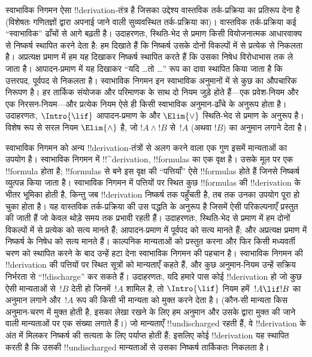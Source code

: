 \documentclass[../../../include/open-logic-section]{subfiles}
\begin{document}
      {}
      {}


स्वाभाविक निगमन ऐसा !!{derivation}-तंत्र है जिसका उद्देश्य वास्तविक
तर्क-प्रक्रिया का प्रतिरूप देना है (विशेषतः गणितज्ञों द्वारा अपनाई जाने वाली
सुव्यवस्थित तर्क-प्रक्रिया का)। वास्तविक तर्क-प्रक्रिया कई ``स्वाभाविक''
ढाँचों से आगे बढ़ती है। उदाहरणतः, स्थिति-भेद से प्रमाण किसी वियोजनात्मक
आधारवाक्य से निष्कर्ष स्थापित करने देता है: हम दिखाते हैं कि निष्कर्ष उसके
दोनों विकल्पों में से प्रत्येक से निकलता है। अप्रत्यक्ष प्रमाण में हम यह
दिखाकर निष्कर्ष स्थापित करते हैं कि उसका निषेध विरोधाभास तक ले जाता है।
आपादन-प्रमाण में यह दिखाकर ``यदि \dots तो \dots'' रूप का दावा स्थापित किया
जाता है कि उत्तरपद, पूर्वपद से निकलता है। स्वाभाविक निगमन इन स्वाभाविक
अनुमानों में से कुछ का औपचारिक निरूपण है। हर तार्किक संयोजक और परिमाणक के साथ
दो नियम जुड़े होते हैं—एक प्रवेश-नियम और एक निरसन-नियम—और प्रत्येक नियम ऐसे
ही किसी स्वाभाविक अनुमान-ढाँचे के अनुरूप होता है। उदाहरणतः, $\Intro{\lif}$
आपादन-प्रमाण के और $\Elim{\lor}$ स्थिति-भेद से प्रमाण के अनुरूप है। विशेष रूप
से सरल नियम $\Elim{\land}$ है, जो $!A \land !B$ से~$!A$ (अथवा $!B$) का
अनुमान लगाने देता है।

स्वाभाविक निगमन को अन्य !!{derivation}-तंत्रों से अलग करने वाला एक गुण इसमें
मान्यताओं का उपयोग है। स्वाभाविक निगमन में !!^{derivation}, !!{formula}s का
एक वृक्ष है। उसके मूल पर एक !!{formula} होता है; !!{formula}s से बने इस वृक्ष
की ``पत्तियाँ'' ऐसे !!{formula}s होते हैं जिनसे निष्कर्ष व्युत्पन्न किया
जाता है। स्वाभाविक निगमन में पत्तियों पर स्थित कुछ !!{formula}s की
!!{derivation} के भीतर भूमिका होती है, किन्तु जब !!{derivation} निष्कर्ष तक
पहुँचती है, तब तक उनका उपयोग पूरा हो चुका होता है। यह वास्तविक तर्क-प्रक्रिया
की उस पद्धति के अनुरूप है जिसमें ऐसी परिकल्पनाएँ प्रस्तुत की जाती हैं जो केवल
थोड़े समय तक प्रभावी रहती हैं। उदाहरणतः, स्थिति-भेद से प्रमाण में हम दोनों
विकल्पों में से प्रत्येक को सत्य मानते हैं; आपादन-प्रमाण में पूर्वपद को सत्य
मानते हैं; और अप्रत्यक्ष प्रमाण में निष्कर्ष के निषेध को सत्य मानते हैं।
काल्पनिक मान्यताओं को प्रस्तुत करना और फिर किसी मध्यवर्ती चरण को स्थापित करने
के बाद उन्हें हटा देना स्वाभाविक निगमन की पहचान है। स्वाभाविक निगमन की
!!{derivation} की पत्तियों पर स्थित सूत्रों को मान्यताएँ कहते हैं, और कुछ
अनुमान-नियम उन्हें सक्रिय निर्भरता से ``!!{discharge}'' कर सकते हैं। उदाहरणतः,
यदि हमारे पास कोई !!{derivation} हो जो कुछ ऐसी मान्यताओं से~$!B$ देती हो
जिनमें~$!A$ शामिल है, तो $\Intro{\lif}$ नियम हमें~$!A \lif !B$ का अनुमान
लगाने और~$!A$ रूप की किसी भी मान्यता को मुक्त करने देता है। (कौन-सी मान्यता
किस अनुमान-चरण में मुक्त होती है, इसका लेखा रखने के लिए हम अनुमान और उसके द्वारा
मुक्त की जाने वाली मान्यताओं पर एक संख्या लगाते हैं।) जो मान्यताएँ
!!{undischarged} रहती हैं, वे !!{derivation} के अंत में मिलकर निष्कर्ष की
सत्यता के लिए पर्याप्त होती हैं; इसलिए कोई !!{derivation} यह स्थापित करती है
कि उसकी !!{undischarged} मान्यताओं से उसका निष्कर्ष तार्किकतः निकलता है।
\end{document}
